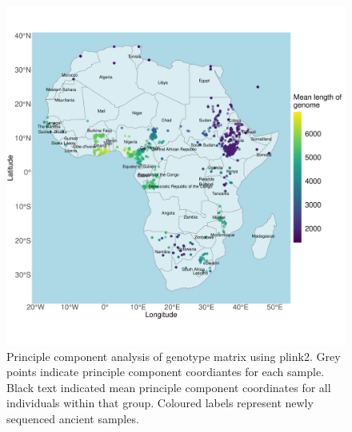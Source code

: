 \begin{figure}[htp]
    \centering
    \includegraphics[width=1.0\textwidth]{../images/appendix/haplotype_map_Caribbean.pdf}
    \caption{Principle component analysis of genotype matrix using plink2. Grey points indicate principle component coordiantes for each sample. Black text indicated mean principle component coordinates for all individuals within that group. Coloured labels represent newly sequenced ancient samples.}
    \label{fig:haplotype_map_Caribbean}
\end{figure}


